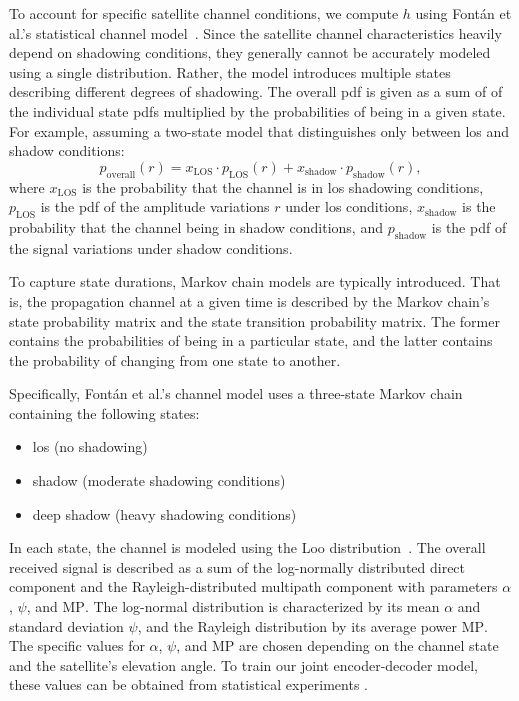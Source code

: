 \documentclass[conference]{IEEEtran}
\newcommand\MP{\ensuremath{\mathrm{MP}}\xspace}
\begin{document}
To account for specific satellite channel conditions, we compute $h$ using Fontán et al.'s statistical channel model~\cite{966585}. 
Since the satellite channel characteristics heavily depend on shadowing conditions, 
they generally cannot be accurately modeled using a single distribution.
Rather, the model introduces multiple states describing different degrees of shadowing. 
The overall \ac{pdf} is given as a sum of of the individual state \acp{pdf} multiplied by the probabilities of being in a given state.
For example, assuming a two-state model that distinguishes only between \ac{los} and shadow conditions: 
%
\begin{equation}
p_{\mathrm{overall}}(r) = x_{\mathrm{LOS}} \cdot p_{\mathrm{LOS}}(r)
  + x_{\mathrm{shadow}} \cdot p_{\mathrm{shadow}}(r),
\end{equation}
%
where $x_{\mathrm{LOS}}$ is the probability that the channel is in \ac{los} shadowing conditions, $p_{\mathrm{LOS}}$ is the \ac{pdf} of the amplitude variations $r$ under \ac{los} conditions, $x_{\mathrm{shadow}}$ is the probability that the channel being in shadow conditions, and $p_{\mathrm{shadow}}$ is the \ac{pdf} of the signal variations under shadow conditions.

To capture state durations, Markov chain models are typically introduced.
That is, the propagation channel at a given time is described by the Markov chain's state probability matrix and the state transition probability matrix.
The former contains the probabilities of being in a particular state, and the latter contains the probability of changing from one state to another.

Specifically, Fontán et al.'s channel model \cite{966585} uses a three-state Markov chain containing the following states:
%
\begin{itemize}
  \item \ac{los} (no shadowing)
  \item shadow (moderate shadowing conditions)
  \item deep shadow (heavy shadowing conditions)
\end{itemize}
%
In each state, the channel is modeled using the Loo distribution~\cite{1623307}. 
The overall received signal is described as a sum of the log-normally distributed direct component and the Rayleigh-distributed multipath component with parameters $\alpha$, $\psi$, and \MP.
The log-normal distribution is characterized by its mean $\alpha$ and standard deviation $\psi$, and the Rayleigh distribution by its average power \MP.
The specific values for $\alpha$, $\psi$, and \MP are chosen depending on the channel state and the satellite's elevation angle.
To train our joint encoder-decoder model, these values can be obtained from statistical experiments \cite{channel-params}.
\end{document}
